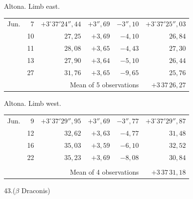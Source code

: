 \noindent\begin{minipage}[t]{.495\textwidth}\centering Altona. Limb east.\par\smallskip
{\scriptsize\setlength{\tabcolsep}{1pt}\renewcommand{\arraystretch}{1.2}\begin{tabular}{lr|r|r|r|r|}
Jun.&7&$+3^\circ37'24''{,}44$&$+3''{,}69$&$-3''{,}10$&$+3^\circ37'25''{,}03$\\
&10&$27{,}25$&$+3{,}69$&$-4{,}10$&$26{,}84$\\
&11&$28{,}08$&$+3{,}65$&$-4{,}43$&$27{,}30$\\
&13&$27{,}90$&$+3{,}64$&$-5{,}10$&$26{,}44$\\
&27&$31{,}76$&$+3{,}65$&$-9{,}65$&$25{,}76$\\
\cline{6-6}\multicolumn{5}{r}{Mean of 5 observations}&$+3\,37\,26{,}27$
\end{tabular}}\end{minipage}\hfill\begin{minipage}[t]{.495\textwidth}\centering Altona. Limb west.\par\smallskip
{\scriptsize\setlength{\tabcolsep}{1pt}\renewcommand{\arraystretch}{1.2}\begin{tabular}{lr|r|r|r|r}
Jun.&9&$+3^\circ37'29''{,}95$&$+3''{,}69$&$-3''{,}77$&$+3^\circ37'29''{,}87$\\
&12&$32{,}62$&$+3{,}63$&$-4{,}77$&$31{,}48$\\
&16&$35{,}03$&$+3{,}59$&$-6{,}10$&$32{,}52$\\
&22&$35{,}23$&$+3{,}69$&$-8{,}08$&$30{,}84$\\
&&&&&\\
\cline{6-6}\multicolumn{5}{r}{Mean of 4 observations}&$+3\,37\,31{,}18$
\end{tabular}}\end{minipage}
\par\vspace{4mm}
\begin{center}43.\quad ($\beta$ Draconis)\end{center}

